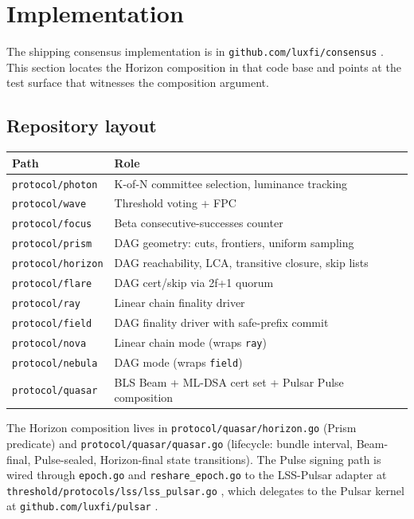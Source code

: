\section{Implementation}
\label{sec:implementation}

The shipping consensus implementation is in \texttt{github.com/luxfi/consensus} \cite{consensusgo}. This section locates the Horizon composition in that code base and points at the test surface that witnesses the composition argument.

\subsection{Repository layout}

\begin{tabular}{@{}p{}p{}@{}}
  \toprule
  \textbf{Path} & \textbf{Role} \\
  \midrule
  \texttt{protocol/photon} & K-of-N committee selection, luminance tracking \\
  \texttt{protocol/wave} & Threshold voting + FPC \\
  \texttt{protocol/focus} & Beta consecutive-successes counter \\
  \texttt{protocol/prism} & DAG geometry: cuts, frontiers, uniform sampling \\
  \texttt{protocol/horizon} & DAG reachability, LCA, transitive closure, skip lists \\
  \texttt{protocol/flare} & DAG cert/skip via 2f+1 quorum \\
  \texttt{protocol/ray} & Linear chain finality driver \\
  \texttt{protocol/field} & DAG finality driver with safe-prefix commit \\
  \texttt{protocol/nova} & Linear chain mode (wraps \texttt{ray}) \\
  \texttt{protocol/nebula} & DAG mode (wraps \texttt{field}) \\
  \texttt{protocol/quasar} & BLS Beam + ML-DSA cert set + Pulsar Pulse composition \\
  \bottomrule
\end{tabular}

The Horizon composition lives in \texttt{protocol/quasar/horizon.go} (Prism predicate) and \texttt{protocol/quasar/quasar.go} (lifecycle: bundle interval, Beam-final, Pulse-sealed, Horizon-final state transitions). The Pulse signing path is wired through \texttt{epoch.go} and \texttt{reshare\_epoch.go} to the LSS-Pulsar adapter at \texttt{threshold/protocols/lss/lss\_pulsar.go} \cite{thresholdgo}, which delegates to the Pulsar kernel at \texttt{github.com/luxfi/pulsar} \cite{pulsar}.

